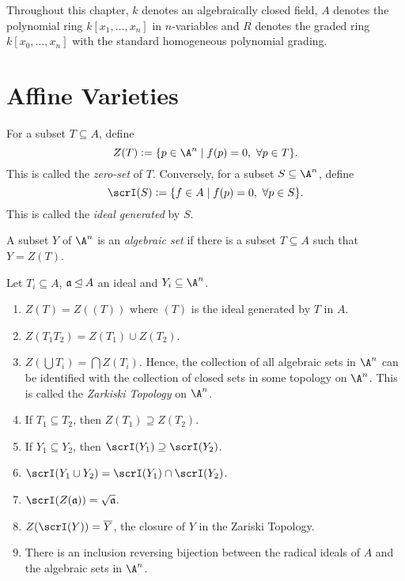 Throughout this chapter, $k$ denotes an algebraically closed field, $A$ denotes the polynomial ring $k[x_1,\dots,x_n]$ in $n$-variables and $R$ denotes the graded ring $k[x_0,\dots,x_n]$ with the standard homogeneous polynomial grading.

\section{Affine Varieties}

\begin{definition}
    For a subset $T\subseteq A$, define 
    \begin{equation*}
        Z(T) := \{p\in\A^n\mid f(p) = 0,~\forall p\in T\}.
    \end{equation*}
    This is called the \emph{zero-set} of $T$. Conversely, for a subset $S\subseteq\A^n$, define 
    \begin{equation*}
        \scrI(S) := \{f\in A\mid f(p) = 0,~\forall p\in S\}.
    \end{equation*}
    This is called the \emph{ideal generated} by $S$.
\end{definition}

\begin{definition}
    A subset $Y$ of $\A^n$ is an \emph{algebraic set} if there is a subset $T\subseteq A$ such that $Y = Z(T)$.
\end{definition}

\begin{theorem}
    Let $T_i\subseteq A$, $\mathfrak a\unlhd A$ an ideal and $Y_i\subseteq\A^n$.
    \begin{enumerate}[label=(\alph*)]
        \item $Z(T) = Z((T))$ where $(T)$ is the ideal generated by $T$ in $A$.
        \item $Z(T_1T_2) = Z(T_1)\cup Z(T_2)$.
        \item $Z(\bigcup T_i) = \bigcap Z(T_i)$. Hence, the collection of all algebraic sets in $\A^n$ can be identified with the collection of closed sets in some topology on $\A^n$. This is called the \emph{Zarkiski Topology} on $\A^n$.
        \item If $T_1\subseteq T_2$, then $Z(T_1)\supseteq Z(T_2)$. 
        \item If $Y_1\subseteq Y_2$, then $\scrI(Y_1)\supseteq\scrI(Y_2)$.
        \item $\scrI(Y_1\cup Y_2) = \scrI(Y_1)\cap\scrI(Y_2)$.
        \item $\scrI(Z(\fraka)) = \sqrt{\fraka}$.
        \item $Z(\scrI(Y)) = \overline Y$, the closure of $Y$ in the Zariski Topology.
        \item There is an inclusion reversing bijection between the radical ideals of $A$ and the algebraic sets in $\A^n$.
    \end{enumerate}
\end{theorem}

